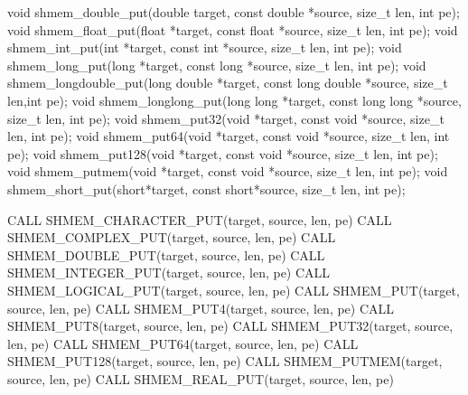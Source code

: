 \synC   %

void shmem_double_put(double target, const double *source, size_t len, int pe);
void shmem_float_put(float *target, const float *source, size_t len, int pe);
void shmem_int_put(int *target, const int *source, size_t len, int pe);
void shmem_long_put(long *target, const long *source, size_t len, int pe);
void shmem_longdouble_put(long double *target, const long double *source, size_t len,int pe);
void shmem_longlong_put(long long *target, const long long *source, size_t len, int pe);
void shmem_put32(void *target, const void *source, size_t len, int pe);
void shmem_put64(void *target, const void *source, size_t len, int pe);
void shmem_put128(void *target, const void *source, size_t len, int pe);
void shmem_putmem(void *target, const void *source, size_t len, int pe);
void shmem_short_put(short*target, const short*source, size_t len, int pe); %

\synF   %

CALL SHMEM_CHARACTER_PUT(target, source, len, pe)
CALL SHMEM_COMPLEX_PUT(target, source, len, pe)
CALL SHMEM_DOUBLE_PUT(target, source, len, pe)
CALL SHMEM_INTEGER_PUT(target, source, len, pe)
CALL SHMEM_LOGICAL_PUT(target, source, len, pe)
CALL SHMEM_PUT(target, source, len, pe)
CALL SHMEM_PUT4(target, source, len, pe)
CALL SHMEM_PUT8(target, source, len, pe)
CALL SHMEM_PUT32(target, source, len, pe)
CALL SHMEM_PUT64(target, source, len, pe)
CALL SHMEM_PUT128(target, source, len, pe)
CALL SHMEM_PUTMEM(target, source, len, pe)
CALL SHMEM_REAL_PUT(target, source, len, pe) %

